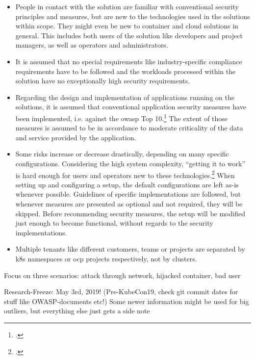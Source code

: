 \begin{itemize}

\item People in contact with the solution are familiar with conventional security principles and measures, but are new to the technologies used in the solutions within scope. They might even be new to container and cloud solutions in general. This includes both users of the solution like developers and project managers, as well as operators and administrators.

\item It is assumed that no special requirements like industry-specific compliance requirements have to be followed and the workloads processed within the solution have no exceptionally high security requirements. 

\item Regarding the design and implementation of applications running on the solutions, it is assumed that conventional application security measures have been implemented, i.e. against the \gls{owasp} Top 10.\footcite[][, p. 4]{topten} The extent of those measures is assumed to be in accordance to moderate criticality of the data and service provided by the application.

\item Some risks increase or decrease drastically, depending on many specific configurations. Considering the high system complexity, ``getting it to work'' is hard enough for users and operators new to these technologies.\footcite[][, starting at 3:05]{hackAndHarden} When setting up and configuring a setup, the default configurations are left as-is whenever possible. Guidelines of specific implementations are followed, but whenever measures are presented as optional and not required, they will be skipped. Before recommending security measures, the setup will be modified just enough to become functional, without regards to the security implementations.

\item Multiple tenants like different customers, teams or projects are separated by \gls{k8s} namespaces or \gls{ocp} projects respectively, not by clusters.

\end{itemize}


Focus on three scenarios: attack through network, hijacked container, bad user

Research-Freeze: May 3rd, 2019! (Pre-KubeCon19, check git commit dates for stuff like OWASP-documents etc!)
Some newer information might be used for big outliers, but everything else just gets a side note

